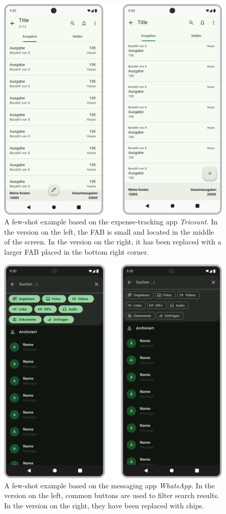 \documentclass[11pt,titlepage,oneside,openany]{book}
\begin{document}
\begin{figure}[H]
	\centering
	\includegraphics[width=.56\textwidth]{figures/few_shot_1.png}
	\caption{A few-shot example based on the expense-tracking app \emph{Tricount}. In the version on the left, the FAB is small and located in the middle of the screen. In the version on the right, it has been replaced with a larger FAB placed in the bottom right corner.}
	\label{fig:fs_1}
\end{figure}

\begin{figure}[H]
	\centering
	\includegraphics[width=.56\textwidth]{figures/few_shot_2.png}
	\caption{A few-shot example based on the messaging app \emph{WhatsApp}. In the version on the left, common buttons are used to filter search results. In the version on the right, they have been replaced with chips.}
	\label{fig:fs_2}
\end{figure}
\end{document}
